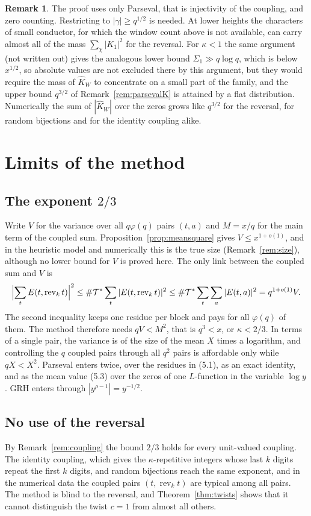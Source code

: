 \documentclass[11pt]{amsart}
\theoremstyle{definition}
\newtheorem{remark}[theorem]{Remark}
\numberwithin{equation}{section}
\newcommand{\rev}{\operatorname{rev}}
\newcommand{\cT}{\mathcal{T}}
\begin{document}
\begin{remark}
The proof uses only Parseval, that is injectivity of the coupling, and zero counting. Restricting to $|\gamma|\ge q^{1/2}$ is needed. At lower heights the characters of small conductor, for which the window count above is not available, can carry almost all of the mass $\sum_\chi|K_1|^2$ for the reversal. For $\kappa<1$ the same argument (not written out) gives the analogous lower bound $\Sigma_1\gg q\log q$, which is below $x^{1/2}$, so absolute values are not excluded there by this argument, but they would require the mass of $\hat K_W$ to concentrate on a small part of the family, and the upper bound $q^{3/2}$ of Remark~\ref{rem:parsevalK} is attained by a flat distribution. Numerically the sum of $|\hat K_W|$ over the zeros grows like $q^{3/2}$ for the reversal, for random bijections and for the identity coupling alike.
\end{remark}

\section{Limits of the method}\label{sec:limits}

\subsection{\texorpdfstring{The exponent $2/3$}{The exponent 2/3}}
Write $V$ for the variance over all $q\varphi(q)$ pairs $(t,a)$ and $M=x/q$ for the main term of the coupled sum. Proposition~\ref{prop:meansquare} gives $V\le x^{1+o(1)}$, and in the heuristic model and numerically this is the true size (Remark~\ref{rem:size}), although no lower bound for $V$ is proved here. The only link between the coupled sum and $V$ is
\[
\Bigl|\sum_tE(t,\rev_kt)\Bigr|^2\le\#\cT^*\sum_t|E(t,\rev_kt)|^2\le\#\cT^*\sum_t\sum_a|E(t,a)|^2=q^{1+o(1)}V.
\]
The second inequality keeps one residue per block and pays for all $\varphi(q)$ of them. The method therefore needs $qV<M^2$, that is $q^3<x$, or $\kappa<2/3$. In terms of a single pair, the variance is of the size of the mean $X$ times a logarithm, and controlling the $q$ coupled pairs through all $q^2$ pairs is affordable only while $qX<X^2$. Parseval enters twice, over the residues in (5.1), as an exact identity, and as the mean value (5.3) over the zeros of one $L$-function in the variable $\log y$. GRH enters through $|y^{\rho-1}|=y^{-1/2}$.

\subsection{No use of the reversal}
By Remark~\ref{rem:coupling} the bound $2/3$ holds for every unit-valued coupling. The identity coupling, which gives the $\kappa$-repetitive integers whose last $k$ digits repeat the first $k$ digits, and random bijections reach the same exponent, and in the numerical data the coupled pairs $(t,\rev_kt)$ are typical among all pairs. The method is blind to the reversal, and Theorem~\ref{thm:twists} shows that it cannot distinguish the twist $c=1$ from almost all others.
\end{document}
